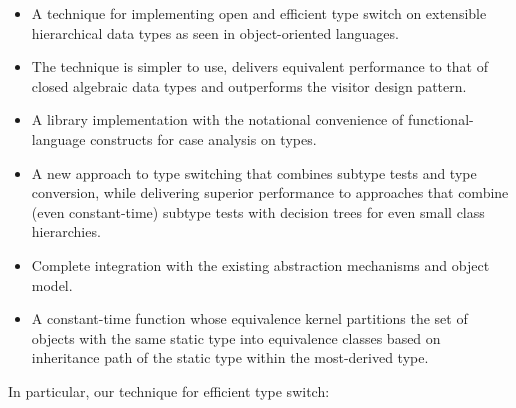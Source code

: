   \begin{itemize}
  \setlength{\itemsep}{0pt}
  \setlength{\parskip}{0pt}
  \item A technique for implementing open and efficient type 
        switch on extensible hierarchical data types as seen in 
        object-oriented languages.
  \item The technique is simpler to use, delivers equivalent performance to that 
        of closed algebraic data types and outperforms the visitor design pattern.
  \item A library implementation with the notational convenience of
        functional-language constructs for case analysis on types.
  \item A new approach to type switching that combines subtype tests and type 
        conversion, while delivering superior performance to approaches that 
        combine (even constant-time) subtype tests with decision trees for even 
        small class hierarchies. 
  \item Complete integration with the existing \Cpp{} abstraction mechanisms and 
        object model.
  \item A constant-time function whose equivalence kernel partitions 
        the set of objects with the same static type into equivalence classes 
        based on inheritance path of the static type within the most-derived type.
  \end{itemize}

\noindent
In particular, our technique for efficient type switch:

